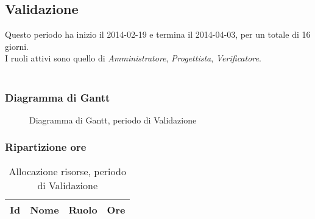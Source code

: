 	
	\subsection{Validazione}
	
Questo periodo ha inizio il 2014-02-19 e termina il 2014-04-03, per un totale di 16 giorni. \\
I ruoli attivi sono quello di \textit{Amministratore}, \textit{Progettista}, \textit{Verificatore}. \\ \\

\subsubsection{Diagramma di Gantt}

\begin{figure}[H]
\centering

	

\caption{Diagramma di Gantt, periodo di Validazione}
\end{figure}

\subsubsection{Ripartizione ore}

\begin{table}[H]
\begin{adjustwidth}{-4cm}{-4cm}
	\centering
	\begin{tabular}{ l l l c  }
	\hline
	\multicolumn{1}{c}{\textbf{Id}} & 
	\multicolumn{1}{c}{\textbf{Nome}} & 
	\multicolumn{1}{c}{\textbf{Ruolo}}& 
	\multicolumn{1}{c}{\textbf{Ore}} \\
	\hline
	
		

	\end{tabular}
	\caption{Allocazione risorse, periodo di Validazione}
\end{adjustwidth}
\end{table}	
	
	

